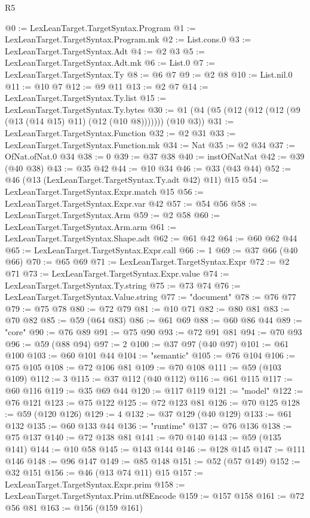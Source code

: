 \begin{lexlean}{R5}
\begin{coremodule}
@0 := LexLeanTarget.TargetSyntax.Program
@1 := LexLeanTarget.TargetSyntax.Program.mk
@2 := List.cons.{0}
@3 := LexLeanTarget.TargetSyntax.Adt
@4 := @2 @3
@5 := LexLeanTarget.TargetSyntax.Adt.mk
@6 := List.{0}
@7 := LexLeanTarget.TargetSyntax.Ty
@8 := @6 @7
@9 := @2 @8
@10 := List.nil.{0}
@11 := @10 @7
@12 := @9 @11
@13 := @2 @7
@14 := LexLeanTarget.TargetSyntax.Ty.list
@15 := LexLeanTarget.TargetSyntax.Ty.bytes
@30 := @1 (@4 (@5 (@12 (@12 (@12 (@9 (@13 (@14 @15) @11) (@12 (@10 @8))))))) (@10 @3))
@31 := LexLeanTarget.TargetSyntax.Function
@32 := @2 @31
@33 := LexLeanTarget.TargetSyntax.Function.mk
@34 := Nat
@35 := @2 @34
@37 := OfNat.ofNat.{0} @34
@38 := 0
@39 := @37 @38
@40 := instOfNatNat
@42 := @39 (@40 @38)
@43 := @35 @42
@44 := @10 @34
@46 := @33 (@43 @44)
@52 := @46 (@13 (LexLeanTarget.TargetSyntax.Ty.adt @42) @11) @15
@54 := LexLeanTarget.TargetSyntax.Expr.match @15
@56 := LexLeanTarget.TargetSyntax.Expr.var @42
@57 := @54 @56
@58 := LexLeanTarget.TargetSyntax.Arm
@59 := @2 @58
@60 := LexLeanTarget.TargetSyntax.Arm.arm
@61 := LexLeanTarget.TargetSyntax.Shape.adt
@62 := @61 @42
@64 := @60 @62 @44
@65 := LexLeanTarget.TargetSyntax.Expr.call
@66 := 1
@69 := @37 @66 (@40 @66)
@70 := @65 @69
@71 := LexLeanTarget.TargetSyntax.Expr
@72 := @2 @71
@73 := LexLeanTarget.TargetSyntax.Expr.value
@74 := LexLeanTarget.TargetSyntax.Ty.string
@75 := @73 @74
@76 := LexLeanTarget.TargetSyntax.Value.string
@77 := "document"
@78 := @76 @77
@79 := @75 @78
@80 := @72 @79
@81 := @10 @71
@82 := @80 @81
@83 := @70 @82
@85 := @59 (@64 @83)
@86 := @61 @69
@88 := @60 @86 @44
@89 := "core"
@90 := @76 @89
@91 := @75 @90
@93 := @72 @91 @81
@94 := @70 @93
@96 := @59 (@88 @94)
@97 := 2
@100 := @37 @97 (@40 @97)
@101 := @61 @100
@103 := @60 @101 @44
@104 := "semantic"
@105 := @76 @104
@106 := @75 @105
@108 := @72 @106 @81
@109 := @70 @108
@111 := @59 (@103 @109)
@112 := 3
@115 := @37 @112 (@40 @112)
@116 := @61 @115
@117 := @60 @116
@119 := @35 @69 @44
@120 := @117 @119
@121 := "model"
@122 := @76 @121
@123 := @75 @122
@125 := @72 @123 @81
@126 := @70 @125
@128 := @59 (@120 @126)
@129 := 4
@132 := @37 @129 (@40 @129)
@133 := @61 @132
@135 := @60 @133 @44
@136 := "runtime"
@137 := @76 @136
@138 := @75 @137
@140 := @72 @138 @81
@141 := @70 @140
@143 := @59 (@135 @141)
@144 := @10 @58
@145 := @143 @144
@146 := @128 @145
@147 := @111 @146
@148 := @96 @147
@149 := @85 @148
@151 := @52 (@57 @149)
@152 := @32 @151
@156 := @46 (@13 @74 @11) @15
@157 := LexLeanTarget.TargetSyntax.Expr.prim
@158 := LexLeanTarget.TargetSyntax.Prim.utf8Encode
@159 := @157 @158
@161 := @72 @56 @81
@163 := @156 (@159 @161)

\end{coremodule}
\end{lexlean}
